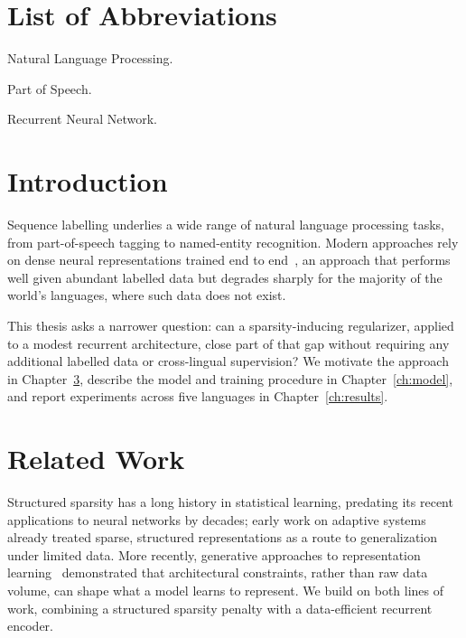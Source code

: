 \documentclass[fullpage]{uiucthesis}
\begin{document}
\tableofcontents
\listoftables
\listoffigures

\chapter{List of Abbreviations}

\begin{symbollist*}
\item[NLP] Natural Language Processing.
\item[POS] Part of Speech.
\item[RNN] Recurrent Neural Network.
\end{symbollist*}

\mainmatter

\chapter{Introduction}
\label{ch:intro}

Sequence labelling underlies a wide range of natural language
processing tasks, from part-of-speech tagging to named-entity
recognition. Modern approaches rely on dense neural representations
trained end to end~\cite{vaswani2017}, an approach that performs
well given abundant labelled data but degrades sharply for the
majority of the world's languages, where such data does not exist.

This thesis asks a narrower question: can a sparsity-inducing
regularizer, applied to a modest recurrent architecture, close part
of that gap without requiring any additional labelled data or
cross-lingual supervision? We motivate the approach in
Chapter~\ref{ch:related}, describe the model and training procedure
in Chapter~\ref{ch:model}, and report experiments across five
languages in Chapter~\ref{ch:results}.

\chapter{Related Work}
\label{ch:related}

Structured sparsity has a long history in statistical learning,
predating its recent applications to neural networks by decades;
early work on adaptive systems~\cite{holland1975} already treated
sparse, structured representations as a route to generalization
under limited data. More recently, generative approaches to
representation learning~\cite{goodfellow2014} demonstrated that
architectural constraints, rather than raw data volume, can shape
what a model learns to represent. We build on both lines of work,
combining a structured sparsity penalty with a data-efficient
recurrent encoder.
\end{document}
